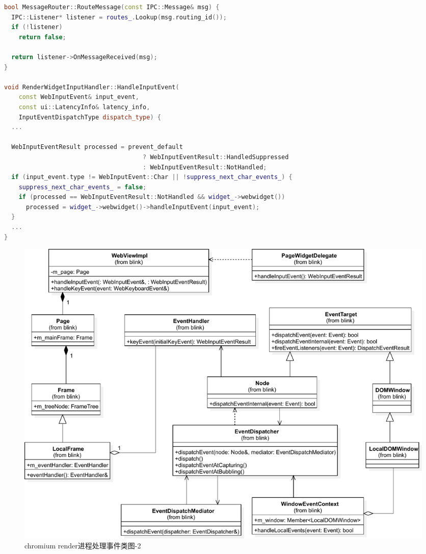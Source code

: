 \begin{spacing}{1.0}
\begin{lstlisting}[language={C++}]
bool MessageRouter::RouteMessage(const IPC::Message& msg) {
  IPC::Listener* listener = routes_.Lookup(msg.routing_id());
  if (!listener)
    return false;

  return listener->OnMessageReceived(msg);
}

void RenderWidgetInputHandler::HandleInputEvent(
    const WebInputEvent& input_event,
    const ui::LatencyInfo& latency_info,
    InputEventDispatchType dispatch_type) {
  ...
  
  WebInputEventResult processed = prevent_default
                                      ? WebInputEventResult::HandledSuppressed
                                      : WebInputEventResult::NotHandled;
  if (input_event.type != WebInputEvent::Char || !suppress_next_char_events_) {
    suppress_next_char_events_ = false;
    if (processed == WebInputEventResult::NotHandled && widget_->webwidget())
      processed = widget_->webwidget()->handleInputEvent(input_event);
  }
  ...  
}
\end{lstlisting}
\end{spacing}


\begin{figure}[H] 
  \centering 
  \includegraphics[width=\textwidth]{image/event_study/render_event_handle_class.pdf} 
  \caption{chromium render进程处理事件类图-2} \label{fig:render_event_handle_class} 
\end{figure}

